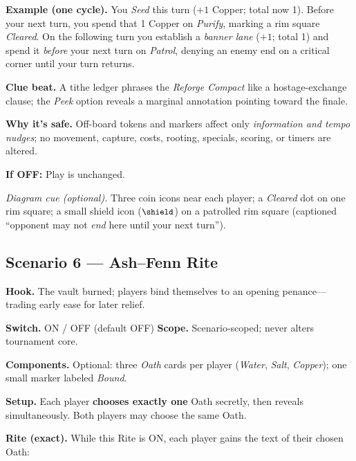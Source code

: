 \documentclass[11pt]{article}
\numberwithin{equation}{section} %
\theoremstyle{plain} %
\theoremstyle{definition} %
\theoremstyle{remark} %
\begin{document}
\medskip
\noindent\textbf{Example (one cycle).}  
You \emph{Seed} this turn (\(+1\) Copper; total now 1). Before your next turn, you spend that 1 Copper on \emph{Purify}, marking a rim square \emph{Cleared}. On the following turn you establish a \emph{banner lane} (\(+1\); total 1) and spend it \emph{before} your next turn on \emph{Patrol}, denying an enemy end on a critical corner until your turn returns.

\medskip
\noindent\textbf{Clue beat.} A tithe ledger phrases the \emph{Reforge Compact} like a hostage-exchange clause; the \emph{Peek} option reveals a marginal annotation pointing toward the finale.

\medskip
\noindent\textbf{Why it’s safe.} Off-board tokens and markers affect only \emph{information and tempo nudges}; no movement, capture, costs, rooting, specials, scoring, or timers are altered.

\medskip
\noindent\textbf{If \textsc{OFF}:} Play is unchanged.

\medskip
\noindent\textit{Diagram cue (optional).} Three coin icons near each player; a \emph{Cleared} dot on one rim square; a small shield icon (\(\small\shield\)) on a patrolled rim square (captioned “opponent may not \emph{end} here until your next turn”).

\subsection{Scenario 6 — Ash–Fenn Rite}
\label{scen:ash-fenn-rite}

\noindent\textbf{Hook.} The vault burned; players bind themselves to an opening penance—trading early ease for later relief.

\medskip
\noindent\textbf{Switch.} \textsc{ON / OFF} (default \textsc{OFF}) \hfill \textbf{Scope.} Scenario-scoped; never alters tournament core.

\medskip
\noindent\textbf{Components.} Optional: three \emph{Oath} cards per player (\textit{Water}, \textit{Salt}, \textit{Copper}); one small marker labeled \emph{Bound}.

\medskip
\noindent\textbf{Setup.} Each player \textbf{chooses exactly one} Oath secretly, then reveals simultaneously. Both players may choose the same Oath.

\medskip
\noindent\textbf{Rite (exact).} While this Rite is \textsc{ON}, each player gains the text of their chosen Oath:
\end{document}
